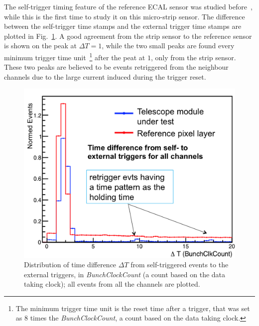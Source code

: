 \documentclass[conference]{IEEEtran}
\begin{document}
The self-trigger timing feature of the reference ECAL sensor was studied before~\cite{lycoris1},
while this is the first time to study it on this micro-strip sensor.
The difference between the self-trigger time stamps and the external trigger time stamps are plotted in Fig.~\ref{fig:res1}.
A good agreement from the strip sensor to the reference sensor is shown on the peak at $\Delta T=1$,
while the two small peaks are found every minimum trigger time unit~\footnote{The minimum trigger time unit is the reset time after a trigger, that was set as $8$ times the \textit{BunchClockCount}, a count based on the data taking clock.}
after the peat at $1$, only from the strip sensor.
These two peaks are believed to be events retriggered from the neighbour channels due to the large current induced during the trigger reset.
\begin{figure}[!ht]%
  \centering
  \includegraphics[width=0.8\linewidth]{pics/Res_pic1.png}
  \caption{Distribution of time difference $\Delta T$ from self-triggered events to the external triggers, in \textit{BunchClockCount} (a count based on the data taking clock); all events from all the channels are plotted. }%
\label{fig:res1}%
\end{figure}
\end{document}
